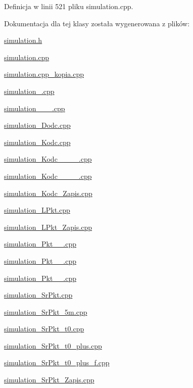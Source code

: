 Definicja w linii 521 pliku simulation.\+cpp.



Dokumentacja dla tej klasy została wygenerowana z plików\+:\begin{DoxyCompactItemize}
\item 
\hyperlink{simulation_8h}{simulation.\+h}\item 
\hyperlink{simulation_8cpp}{simulation.\+cpp}\item 
\hyperlink{simulation_8cpp__kopia_8cpp}{simulation.\+cpp\+\_\+kopia.\+cpp}\item 
\hyperlink{simulation__1_8cpp}{simulation\+\_.\+cpp}\item 
\hyperlink{simulation__2011__03__25_8cpp}{simulation\+\_\+\_\+\_.\+cpp}\item 
\hyperlink{simulation___dodc_8cpp}{simulation\+\_\+\+Dodc.\+cpp}\item 
\hyperlink{simulation___kodc_8cpp}{simulation\+\_\+\+Kodc.\+cpp}\item 
\hyperlink{simulation___kodc__1780__90__730__40_8cpp}{simulation\+\_\+\+Kodc\+\_\+\_\+\_\+\_.\+cpp}\item 
\hyperlink{simulation___kodc__1790__800__740__50_8cpp}{simulation\+\_\+\+Kodc\+\_\+\_\+\_\+\_.\+cpp}\item 
\hyperlink{simulation___kodc___zapis_8cpp}{simulation\+\_\+\+Kodc\+\_\+\+Zapis.\+cpp}\item 
\hyperlink{simulation___l_pkt_8cpp}{simulation\+\_\+\+L\+Pkt.\+cpp}\item 
\hyperlink{simulation___l_pkt___zapis_8cpp}{simulation\+\_\+\+L\+Pkt\+\_\+\+Zapis.\+cpp}\item 
\hyperlink{simulation___pkt__1780__730_8cpp}{simulation\+\_\+\+Pkt\+\_\+\_.\+cpp}\item 
\hyperlink{simulation___pkt__1790__740_8cpp}{simulation\+\_\+\+Pkt\+\_\+\_.\+cpp}\item 
\hyperlink{simulation___pkt__1800__750_8cpp}{simulation\+\_\+\+Pkt\+\_\+\_.\+cpp}\item 
\hyperlink{simulation___sr_pkt_8cpp}{simulation\+\_\+\+Sr\+Pkt.\+cpp}\item 
\hyperlink{simulation___sr_pkt__5m_8cpp}{simulation\+\_\+\+Sr\+Pkt\+\_\+5m.\+cpp}\item 
\hyperlink{simulation___sr_pkt__t0_8cpp}{simulation\+\_\+\+Sr\+Pkt\+\_\+t0.\+cpp}\item 
\hyperlink{simulation___sr_pkt__t0__plus_8cpp}{simulation\+\_\+\+Sr\+Pkt\+\_\+t0\+\_\+plus.\+cpp}\item 
\hyperlink{simulation___sr_pkt__t0__plus__f_8cpp}{simulation\+\_\+\+Sr\+Pkt\+\_\+t0\+\_\+plus\+\_\+f.\+cpp}\item 
\hyperlink{simulation___sr_pkt___zapis_8cpp}{simulation\+\_\+\+Sr\+Pkt\+\_\+\+Zapis.\+cpp}\end{DoxyCompactItemize}
